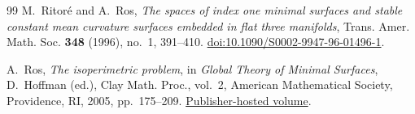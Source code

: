 \begin{thebibliography}{99}
M.~Ritor\'e and A.~Ros,
\emph{The spaces of index one minimal surfaces and stable constant mean curvature surfaces embedded in flat three manifolds},
Trans. Amer. Math. Soc. \textbf{348} (1996), no.~1, 391--410.
\href{https://doi.org/10.1090/S0002-9947-96-01496-1}{doi:10.1090/S0002-9947-96-01496-1}.

A.~Ros,
\emph{The isoperimetric problem},
in \emph{Global Theory of Minimal Surfaces}, D.~Hoffman (ed.),
Clay Math. Proc., vol.~2, American Mathematical Society, Providence, RI,
2005, pp.~175--209.
\href{https://www.claymath.org/wp-content/uploads/2022/03/cmip02.pdf}{Publisher-hosted volume}.

\end{thebibliography}
\endgroup
